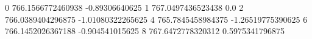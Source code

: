 0 766.1566772460938 -0.89306640625
1 767.0497436523438 0.0
2 766.0389404296875 -1.01080322265625
4 765.7845458984375 -1.26519775390625
6 766.1452026367188 -0.904541015625
8 767.6472778320312 0.5975341796875
